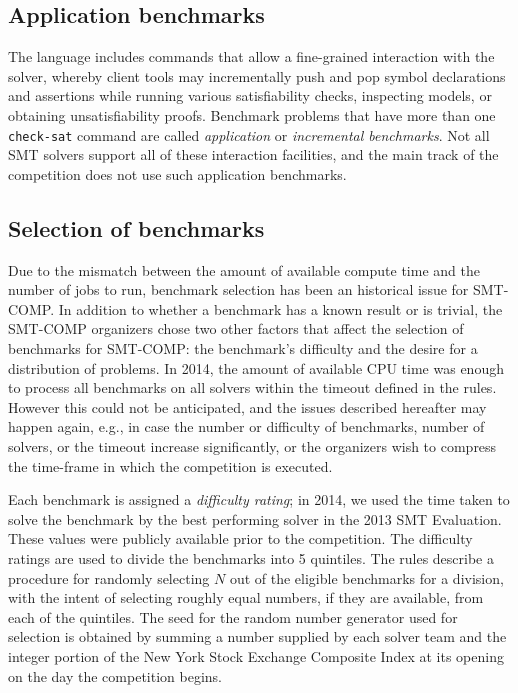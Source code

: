 \documentclass[twoside,11pt]{article}
\begin{document}
\subsection{Application benchmarks}

The language includes commands that allow a fine-grained interaction
with the solver, whereby client tools may incrementally push and pop
symbol declarations and assertions while running various
satisfiability checks, inspecting models, or obtaining unsatisfiability
proofs. Benchmark problems that have more than one
\lstinline{check-sat} command are called \emph{application} or \emph{incremental
  benchmarks}. Not all SMT solvers support all of these interaction
facilities, and the main track of the competition does not use such
application benchmarks.


\subsection{Selection of benchmarks}
\label{sec:benchmark-selection}

Due to the mismatch between the amount of available compute time and the number of jobs to run, benchmark selection has been an historical issue for SMT-COMP. In addition to whether a benchmark has a known result or is trivial, the SMT-COMP organizers chose two other factors that affect the selection of benchmarks for SMT-COMP: the benchmark's difficulty and the desire for a distribution of problems. In 2014, the amount of available CPU time was enough to process all benchmarks on all solvers within the timeout defined in the rules. However this could not be anticipated, and the issues described hereafter may happen again, e.g., in case the number or difficulty of benchmarks, number of solvers, or the timeout increase significantly, or the organizers wish to compress the time-frame in which the competition is executed.

Each benchmark is assigned a \emph{difficulty rating}; in 2014, we used the time taken to solve the benchmark by the best performing solver in the 2013 SMT Evaluation. These values were publicly available prior to the competition. The difficulty ratings are used to divide the benchmarks into 5 quintiles. The rules describe a procedure for randomly selecting $N$ out of the eligible benchmarks for a division, with the intent of selecting roughly equal numbers, if they are available, from each of the quintiles.  The seed for the random number generator used for selection is obtained by summing a number supplied by each solver team and the integer portion of the New York Stock Exchange Composite Index at its opening on the day the competition begins.
\end{document}
